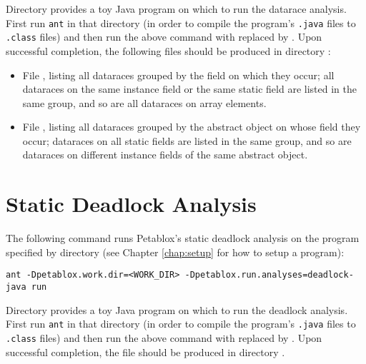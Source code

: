 Directory  provides a toy Java program on which to
run the datarace analysis.  First run {\tt ant} in that directory (in order to
compile the program's {\tt .java} files to {\tt .class} files) and then run the
above command with  replaced by .
Upon successful completion, the following files should be produced in directory
:

\begin{itemize}
\item
File , listing all dataraces grouped by the field on
which they occur; all dataraces on the same instance field or the same static
field are listed in the same group, and so are all dataraces on array elements.
\item
File , listing all dataraces grouped by the abstract
object on whose field they occur; dataraces on all static fields are listed in
the same group, and so are dataraces on different instance fields of the same
abstract object.
\end{itemize}

\section{Static Deadlock Analysis}

The following command runs Petablox's static deadlock analysis on the
program specified by directory  (see Chapter \ref{chap:setup}
for how to setup a program):

\begin{framed}
\begin{verbatim}
ant -Dpetablox.work.dir=<WORK_DIR> -Dpetablox.run.analyses=deadlock-java run
\end{verbatim}
\end{framed}

Directory  provides a toy Java program on which to
run the deadlock analysis.  First run {\tt ant} in that directory (in order to
compile the program's {\tt .java} files to {\tt .class} files) and then run the
above command with  replaced by .
Upon successful completion, the file  should be produced in
directory .

